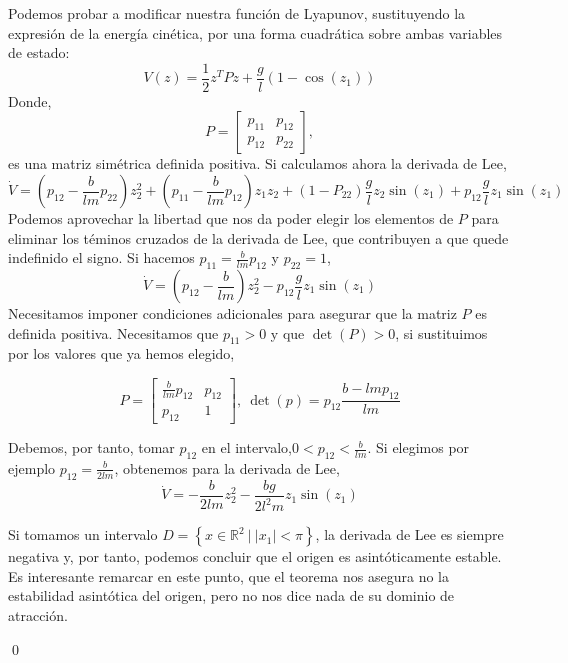 \begin{example}
Podemos probar a modificar nuestra función de Lyapunov, sustituyendo la expresión de la energía cinética, por una forma cuadrática sobre ambas variables de estado:
\begin{equation*}
V(z) = \frac{1}{2} z^TPz+ \frac{g}{l}\left(1-\cos(z_1)\right)
\end{equation*}
Donde,
\begin{equation*}
P = \begin{bmatrix}
p_{11} & p_{12}\\ p_{12} & p_{22}
\end{bmatrix},
\end{equation*}
es una matriz simétrica definida positiva.
Si calculamos ahora la derivada de Lee,
\begin{equation*}
\dot V =\left(p_{12}-\frac{b}{lm}p_{22}\right)z_2^2+ \left(p_{11}-\frac{b}{lm}p_{12} \right) z_1z_2 + (1 -P_{22})\frac{g}{l} z_2\sin(z_1) + p_{12}\frac{g}{l} z_1\sin(z_1)
\end{equation*}
Podemos aprovechar la libertad que nos da poder elegir los elementos de $P$ para eliminar los téminos cruzados de la derivada de Lee, que contribuyen a que quede indefinido el signo. Si hacemos $p_{11} = \frac{b}{lm}p_{12}$ y $p_{22}=1$,
\begin{equation*}
\dot V =\left(p_{12}-\frac{b}{lm}\right)z_2^2-p_{12}\frac{g}{l} z_1\sin(z_1)
\end{equation*}
Necesitamos imponer condiciones adicionales  para asegurar que la matriz $P$ es definida positiva. Necesitamos que $p_{11}>0$ y que $\det(P)>0$, si sustituimos por los valores que ya hemos elegido,

\begin{equation*}
P =\begin{bmatrix}
\frac{b}{lm}p_{12} & p_{12}\\
p_{12} & 1
\end{bmatrix}, \ \det(p) = p_{12}\frac{b-lmp_{12}}{lm}
\end{equation*}

Debemos, por tanto, tomar $p_{12}$ en el intervalo,$0<p_{12}< \frac{b}{lm}$. Si elegimos por ejemplo $p_{12} =  \frac{b}{2lm}$, obtenemos para la derivada de Lee,
\begin{equation*}
\dot V =-\frac{b}{2lm}z_2^2-\frac{bg}{2l^2m}z_1 \sin(z_1)
\end{equation*}

Si tomamos un intervalo $D=\left\{x \in \mathbb{R}^2 \ | \ |x_1|<\pi \right\}$, la derivada de Lee es siempre negativa y, por tanto, podemos concluir que el origen es asintóticamente estable. Es interesante remarcar en este punto, que el teorema nos asegura no la estabilidad asintótica del origen, pero no nos dice nada de su dominio de atracción.

\qed
\end{example}


